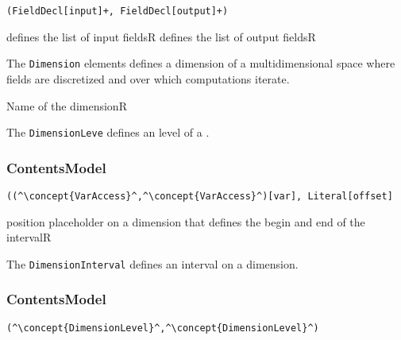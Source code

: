 \begin{lstlisting}[style=default]
(FieldDecl[input]+, FieldDecl[output]+)
\end{lstlisting}

\begin{HIRChildElements}
	{defines the list of input fields}{R}
	{defines the list of output fields}{R}
		
\end{HIRChildElements}


The {\tt Dimension} elements defines a dimension of a multidimensional space where fields are discretized and over which computations iterate. 

\HIRContentsModel{ () }
\begin{HIRAttributes}
	{Name of the dimension}{R}
\end{HIRAttributes}


The {\tt DimensionLeve} defines an level of a . 

\subsubsection*{ContentsModel}{}

\begin{lstlisting}[style=default]
((^\concept{VarAccess}^,^\concept{VarAccess}^)[var], Literal[offset]
\end{lstlisting}

\begin{HIRChildElements}
	{position placeholder on a dimension that defines the begin and end of the interval}{R}
\end{HIRChildElements}


The {\tt DimensionInterval} defines an interval on a dimension. 

\subsubsection*{ContentsModel}{}

\begin{lstlisting}[style=default]
(^\concept{DimensionLevel}^,^\concept{DimensionLevel}^)
\end{lstlisting}

